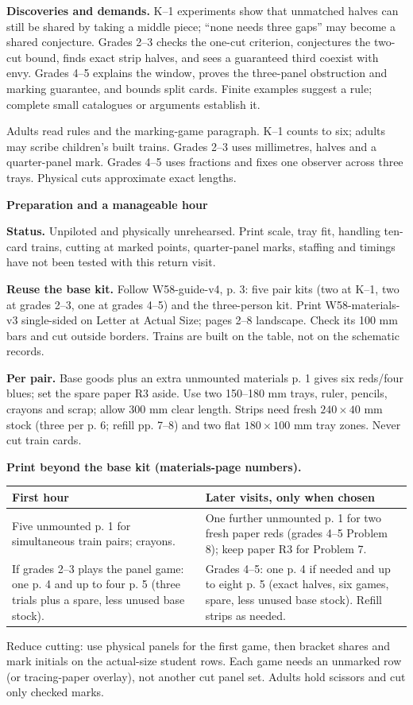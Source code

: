 \documentclass[11pt]{article}
\newcommand{\head}[1]{\par\textbf{\large #1}\par}
\begin{document}
\textbf{Discoveries and demands.} K--1 experiments show that unmatched halves can still be shared by taking a middle piece; ``none needs three gaps'' may become a shared conjecture. Grades 2--3 checks the one-cut criterion, conjectures the two-cut bound, finds exact strip halves, and sees a guaranteed third coexist with envy. Grades 4--5 explains the window, proves the three-panel obstruction and marking guarantee, and bounds split cards. Finite examples suggest a rule; complete small catalogues or arguments establish it.

Adults read rules and the marking-game paragraph. K--1 counts to six; adults may scribe children's built trains. Grades 2--3 uses millimetres, halves and a quarter-panel mark. Grades 4--5 uses fractions and fixes one observer across three trays. Physical cuts approximate exact lengths.
\newpage
\head{Preparation and a manageable hour}
\textbf{Status.} Unpiloted and physically unrehearsed. Print scale, tray fit, handling ten-card trains, cutting at marked points, quarter-panel marks, staffing and timings have not been tested with this return visit.

\textbf{Reuse the base kit.} Follow W58-guide-v4, p. 3: five pair kits (two at K--1, two at grades 2--3, one at grades 4--5) and the three-person kit. Print W58-materials-v3 single-sided on Letter at Actual Size; pages 2--8 landscape. Check its 100 mm bars and cut outside borders. Trains are built on the table, not on the schematic records.

\textbf{Per pair.} Base goods plus an extra unmounted materials p. 1 gives six reds/four blues; set the spare paper R3 aside. Use two 150--180 mm trays, ruler, pencils, crayons and scrap; allow 300 mm clear length. Strips need fresh $240\times40$ mm stock (three per p. 6; refill pp. 7--8) and two flat $180\times100$ mm tray zones. Never cut train cards.

\textbf{Print beyond the base kit (materials-page numbers).}
\begin{center}\small
\begin{tabular}{@{}p{.45\linewidth}p{.49\linewidth}@{}}
\textbf{First hour} & \textbf{Later visits, only when chosen}\\\midrule
Five unmounted p. 1 for simultaneous train pairs; crayons. & One further unmounted p. 1 for two fresh paper reds (grades 4--5 Problem 8); keep paper R3 for Problem 7.\\[4pt]
If grades 2--3 plays the panel game: one p. 4 and up to four p. 5 (three trials plus a spare, less unused base stock). & Grades 4--5: one p. 4 if needed and up to eight p. 5 (exact halves, six games, spare, less unused base stock). Refill strips as needed.\\
\end{tabular}
\end{center}
Reduce cutting: use physical panels for the first game, then bracket shares and mark initials on the actual-size student rows. Each game needs an unmarked row (or tracing-paper overlay), not another cut panel set. Adults hold scissors and cut only checked marks.
\end{document}
